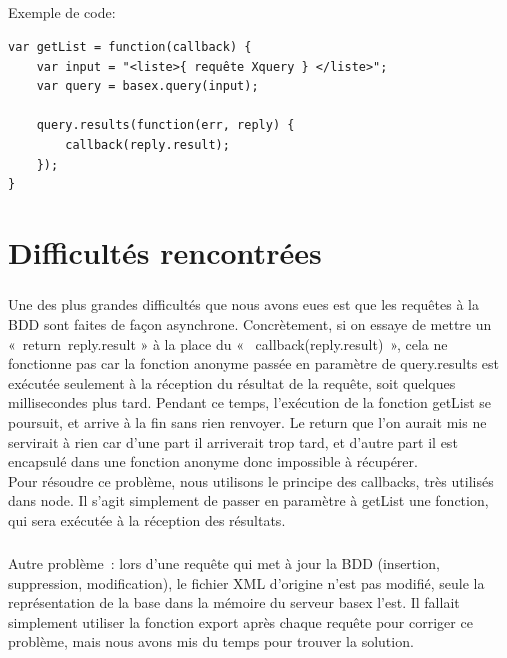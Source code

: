 \documentclass{report}
\begin{document}
	\paragraph{}{
		Exemple de code: \\

\begin{Verbatim}
var getList = function(callback) {
	var input = "<liste>{ requête Xquery } </liste>";
	var query = basex.query(input);

	query.results(function(err, reply) {
		callback(reply.result);
	});
}
\end{Verbatim}
	}



%
\chapter{Difficultés rencontrées}
\thispagestyle{fancy}
	\paragraph{}{
		Une des plus grandes difficultés que nous avons eues est que les requêtes à la BDD sont faites de façon asynchrone. Concrètement, si on essaye de mettre un « return reply.result » à la place du «  callback(reply.result) », cela ne fonctionne pas car la fonction anonyme passée en paramètre de query.results est exécutée seulement à la réception du résultat de la requête, soit quelques millisecondes plus tard. Pendant ce temps, l’exécution de la fonction getList se poursuit, et arrive à la fin sans rien renvoyer. Le return que l’on aurait mis ne servirait à rien car d’une part il arriverait trop tard, et d’autre part il est encapsulé dans une fonction anonyme donc impossible à récupérer.\\
		Pour résoudre ce problème, nous utilisons le principe des callbacks, très utilisés dans node. Il s’agit simplement de passer en paramètre à getList une fonction, qui sera exécutée à la réception des résultats.
	}

	\paragraph{}{
		Autre problème : lors d’une requête qui met à jour la BDD (insertion, suppression, modification), le fichier XML d’origine n’est pas modifié, seule la représentation de la base dans la mémoire du serveur basex l’est. Il fallait simplement utiliser la fonction export après chaque requête pour corriger ce problème, mais nous avons mis du temps pour trouver la solution.
	}
\end{document}
